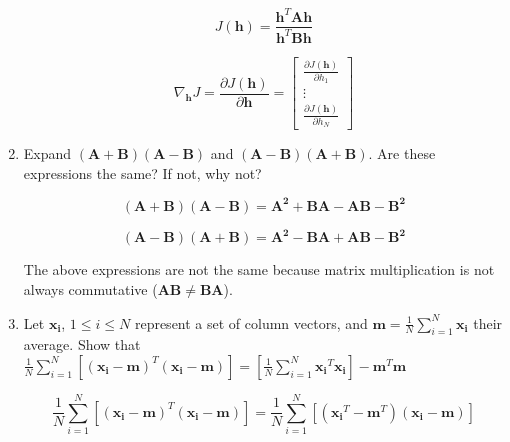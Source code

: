 \documentclass[fleqn]{article}
\begin{document}
\begin{enumerate}
		\begin{equation*}
			J(\mathbf{h}) = \frac{\mathbf{h}^T\mathbf{A}\mathbf{h}}{\mathbf{h}^T\mathbf{B}\mathbf{h}}
		\end{equation*}
		
		\begin{equation*}
			\nabla_{\mathbf{h}}{J} = \frac{\partial{J(\mathbf{h})}}{\partial\mathbf{h}} = \begin{bmatrix}
				\frac{\partial{J(\mathbf{h})}}{\partial{h_1}} \\
				\vdots \\
				\frac{\partial{J(\mathbf{h})}}{\partial{h_N}}
			\end{bmatrix}
		\end{equation*}
		
		\item Expand $(\mathbf{A} + \mathbf{B})(\mathbf{A} - \mathbf{B})$ and $(\mathbf{A} - \mathbf{B})(\mathbf{A} + \mathbf{B})$. Are these expressions the same? If not, why not?
		
		\begin{equation*}
		(\mathbf{A} + \mathbf{B})(\mathbf{A} - \mathbf{B}) = \mathbf{A^2} + \mathbf{B}\mathbf{A} - \mathbf{A}\mathbf{B} - \mathbf{B^2}
		\end{equation*}
		
		\begin{equation*}
		(\mathbf{A} - \mathbf{B})(\mathbf{A} + \mathbf{B}) = \mathbf{A^2} - \mathbf{B}\mathbf{A} + \mathbf{A}\mathbf{B} - \mathbf{B^2}
		\end{equation*}
		
		The above expressions are not the same because matrix multiplication is not always commutative ($\mathbf{AB} \neq \mathbf{BA}$).
		
		\item Let $\mathbf{x_i}$, $1 \leq i \leq N$ represent a set of column vectors, and $\mathbf{m} = \frac{1}{N}\sum_{i=1}^{N}{\mathbf{x_i}}$ their average. Show that $\frac{1}{N}\sum_{i=1}^{N}\left[(\mathbf{x_i}-\mathbf{m})^T(\mathbf{x_i}-\mathbf{m})\right] = \left[\frac{1}{N}\sum_{i=1}^{N}{\mathbf{x_i}^T\mathbf{x_i}}\right]-\mathbf{m}^T\mathbf{m}$
		
		\begin{equation*}
			\frac{1}{N}\sum_{i=1}^{N}\left[(\mathbf{x_i}-\mathbf{m})^T(\mathbf{x_i}-\mathbf{m})\right] = \frac{1}{N}\sum_{i=1}^{N}\left[(\mathbf{x_i}^T-\mathbf{m}^T)(\mathbf{x_i}-\mathbf{m})\right]
		\end{equation*}
			

\end{enumerate}
\end{document}
